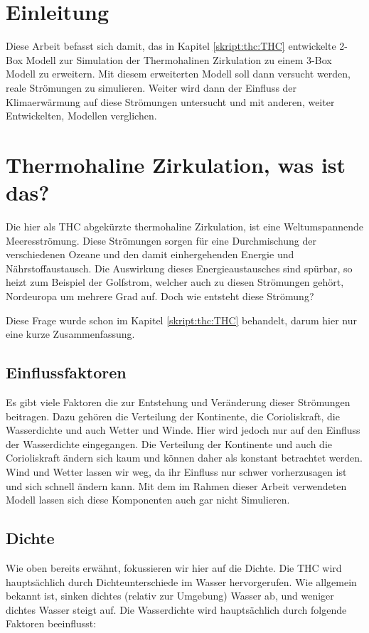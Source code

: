 \section{Einleitung}

Diese Arbeit befasst sich damit, das in Kapitel \ref{skript:thc:THC} entwickelte 2-Box Modell zur Simulation der Thermohalinen Zirkulation zu einem 3-Box Modell zu erweitern. Mit diesem erweiterten Modell soll dann versucht werden, reale Strömungen zu simulieren. Weiter wird dann der Einfluss der Klimaerwärmung auf diese Strömungen untersucht und mit anderen, weiter Entwickelten, Modellen verglichen.


\section{Thermohaline Zirkulation, was ist das?}

Die hier als THC abgekürzte thermohaline Zirkulation, ist eine Weltumspannende Meeresströmung.
Diese Strömungen sorgen für eine Durchmischung der verschiedenen Ozeane und den damit einhergehenden Energie und Nährstoffaustausch. 
Die Auswirkung dieses Energieaustausches sind spürbar, so heizt zum Beispiel der Golfstrom, welcher auch zu diesen Strömungen gehört, Nordeuropa um mehrere Grad auf.
Doch wie entsteht diese Strömung? 

Diese Frage wurde schon im Kapitel \ref{skript:thc:THC} behandelt, darum hier nur eine kurze Zusammenfassung. 



\subsection{Einflussfaktoren}
Es gibt viele Faktoren die zur Entstehung und Veränderung dieser Strömungen beitragen. Dazu gehören die Verteilung der Kontinente, die Corioliskraft, die Wasserdichte und auch Wetter und Winde. Hier wird jedoch nur auf den Einfluss der Wasserdichte eingegangen.
Die Verteilung der Kontinente und auch die Corioliskraft ändern sich kaum und können daher als konstant betrachtet werden. Wind und Wetter lassen wir weg, da ihr Einfluss nur schwer vorherzusagen ist und sich schnell ändern kann. Mit dem im Rahmen dieser Arbeit verwendeten Modell lassen sich diese Komponenten auch gar nicht Simulieren.

\subsection{Dichte}
Wie oben bereits erwähnt, fokussieren wir hier auf die Dichte.
Die THC wird hauptsächlich durch Dichteunterschiede im Wasser hervorgerufen.
Wie allgemein bekannt ist, sinken dichtes (relativ zur Umgebung) Wasser ab, und weniger dichtes Wasser steigt auf. Die Wasserdichte wird hauptsächlich durch folgende Faktoren beeinflusst:

